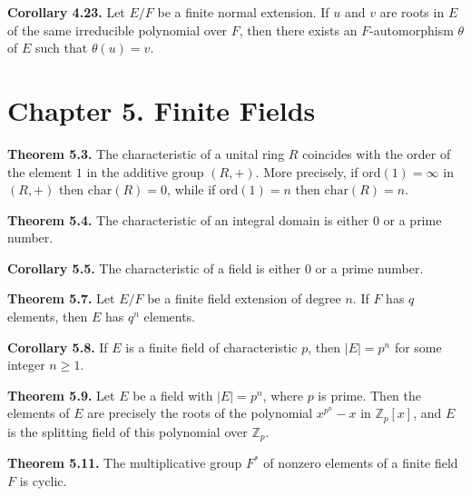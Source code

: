 \documentclass{article}
\newenvironment{theoremx}[1]{\noindent\textbf{Theorem #1.} }{\par}
\newenvironment{corollaryx}[1]{\noindent\textbf{Corollary #1.} }{\par}
\begin{document}
\begin{corollaryx}{4.23}
Let $E/F$ be a finite normal extension.  If $u$ and $v$ are roots in $E$ of the same irreducible polynomial over $F$, then there exists an $F$-automorphism $\theta$ of $E$ such that $\theta(u)=v$.
\end{corollaryx}


\section*{Chapter 5. Finite Fields}

\begin{theoremx}{5.3}
The characteristic of a unital ring $R$ coincides with the order of the element $1$ in the additive group $(R,+)$.  More precisely, if $\mathrm{ord}(1)=\infty$ in $(R,+)$ then $\mathrm{char}(R)=0$, while if $\mathrm{ord}(1)=n$ then $\mathrm{char}(R)=n$.
\end{theoremx}

\begin{theoremx}{5.4}
The characteristic of an integral domain is either $0$ or a prime number.
\end{theoremx}

\begin{corollaryx}{5.5}
The characteristic of a field is either $0$ or a prime number.
\end{corollaryx}

\begin{theoremx}{5.7}
Let $E/F$ be a finite field extension of degree $n$.  If $F$ has $q$ elements, then $E$ has $q^n$ elements.
\end{theoremx}

\begin{corollaryx}{5.8}
If $E$ is a finite field of characteristic $p$, then $|E|=p^n$ for some integer $n\ge1$.
\end{corollaryx}

\begin{theoremx}{5.9}
Let $E$ be a field with $|E|=p^n$, where $p$ is prime.  Then the elements of $E$ are precisely the roots of the polynomial $x^{p^n}-x$ in $\mathbb{Z}_p[x]$, and $E$ is the splitting field of this polynomial over $\mathbb{Z}_p$.
\end{theoremx}

\begin{theoremx}{5.11}
The multiplicative group $F^*$ of nonzero elements of a finite field $F$ is cyclic.
\end{theoremx}
\end{document}
